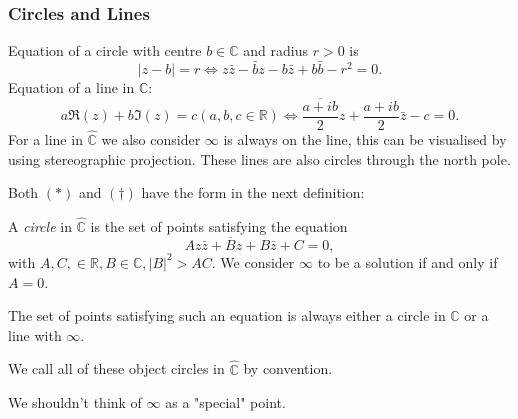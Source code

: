 \documentclass[a4paper]{article}
\begin{document}
\subsubsection{Circles and Lines}
Equation of a circle with centre $b\in \mathbb{C}$ and radius $r>0$ is
\[
  |z-b|=r \Longleftrightarrow z \bar{z}- \bar{b}z-b \bar{z}+ b
  \bar{b}-r^2=0.\tag{$*$}
\]
Equation of a line in $\mathbb{C}$:
\[
  a \Re (z)+b \Im (z)=c(a,b,c\in \mathbb{R}) \Longleftrightarrow
  \overline{\frac{a+ib}{2}}z+\frac{a+ib}{2}\bar{z}-c=0.\tag{$ \dagger $}
\]
For a line in $ \hat{\mathbb{C}} $ we also consider $ \infty  $ is
always on the line, this can be visualised by using stereographic
projection. These lines are also circles through the north pole.

Both $ (*) $ and $(\dagger)$ have the form in the next definition:
\begin{definition}
  A \textit{circle} in $ \hat{\mathbb{C}} $ is the set of points
  satisfying the equation
  \[
    Az \bar{z}+ \overline{B}z+B \bar{z}+C=0,
  \]
  with $ A,C,\in \mathbb{R}, B\in \mathbb{C}, |B|^2>AC $. We consider
  $ \infty  $ to be a solution if and only if $A=0$.
\end{definition}

\begin{exercise}
  The set of points satisfying such an equation is always either a
  circle in $\mathbb{C}$ or a line with $ \infty $.
\end{exercise}

We call all of these object circles in $ \hat{\mathbb{C}} $ by convention.
\begin{remark}
  We shouldn't think of $\infty$ as a "special" point.
\end{remark}
\end{document}
